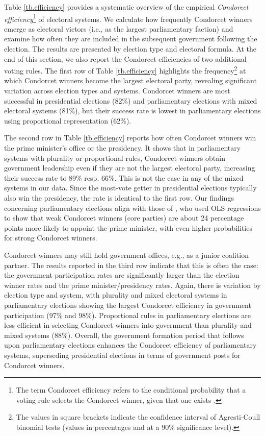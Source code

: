\documentclass[12pt]{scrartcl}
\begin{document}
Table \ref{tb.efficiency} provides a systematic overview of the empirical \textit{Condorcet efficiency}\footnote{
    The term Condorcet efficiency refers to the conditional probability that a voting rule selects the Condorcet winner, given that one exists \citep{Gehrlein1998}.
} of electoral systems. We calculate how frequently Condorcet winners emerge as electoral victors (i.e., as the largest parliamentary faction) and examine how often they are included in the subsequent government following the election. The results are presented by election type and electoral formula. At the end of this section, we also report the Condorcet efficiencies of two additional voting rules. The first row of Table \ref{tb.efficiency} highlights the frequency\footnote{
    The values in square brackets indicate the confidence interval of Agresti-Coull binomial tests \citep{Agresti1998} (values in percentages and at a 90\% significance level).
} at which Condorcet winners become the largest electoral party, revealing significant variation across election types and systems. Condorcet winners are most successful in presidential elections (82\%) and parliamentary elections with mixed electoral systems (81\%), but their success rate is lowest in parliamentary elections using proportional representation (62\%). 
 
The second row in Table \ref{tb.efficiency} reports how often Condorcet winners win the prime minister's office or the presidency. It shows that in parliamentary systems with plurality or proportional rules, Condorcet winners obtain government leadership even if they are not the largest electoral party, increasing their success rate to 89\% resp. 66\%. This is not the case in any of the mixed systems in our data.  Since the most-vote getter in presidential elections typically also win the presidency, the rate is identical to the first row.  Our findings concerning parliamentary elections align with those of \cite{Desai2025}, who used OLS regressions to show that weak Condorcet winners (core parties) are about 24 percentage points more likely to appoint the prime minister, with even higher probabilities for strong Condorcet winners.

Condorcet winners may still hold government offices, e.g., as a junior coalition partner. The results reported in the third row indicate that this is often the case: the government participation rates are significantly larger than the election winner rates and the prime minister/presidency rates. Again, there is variation by election type and system, with plurality and mixed electoral systems in parliamentary elections showing the largest Condorcet efficiency in government participation (97\% and 98\%). Proportional rules in parliamentary elections are less efficient in selecting Condorcet winners into government than plurality and mixed systems (88\%).  Overall, the government formation period that follows upon parliamentary elections enhances the Condorcet efficiency of parliamentary systems, superseding presidential elections in terms of government posts for Condorcet winners.
\end{document}
